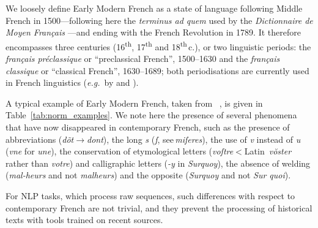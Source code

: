 We loosely define Early Modern French as a state of language following Middle French in 1500---following here the \emph{terminus ad quem} used by the \emph{Dictionnaire de Moyen Français} \cite{martin-2020-dictionnaire}---and ending with the French Revolution in 1789. It therefore encompasses three centuries (16\textsuperscript{th}, 17\textsuperscript{th} and 18\textsuperscript{th}\,c.), or two linguistic periods: the \emph{français préclassique} or ``preclassical French'', 1500--1630 and the \emph{français classique} or ``classical French'', 1630--1689; both periodisations are currently used in French linguistics (\emph{e.g.}~by  and ).

A typical example of Early Modern French, taken from ~, is given in Table~\ref{tab:norm_examples}. We note here the presence of several phenomena that have now disappeared in contemporary French, such as the presence of abbreviations (\emph{dõt}$\to$\emph{dont}), the long \emph{s} (\emph{ſ}, see\,\emph{miſeres}), the use of \emph{v} instead of \emph{u} (\emph{vne} for \emph{une}), the conservation of etymological letters (\emph{voſtre}$<$Latin~\emph{vŏster} rather than \emph{votre}) and calligraphic letters (\emph{-y} in \emph{Surquoy}), the absence of welding  (\emph{\mbox{mal-heurs}} and not \emph{malheurs}) and the opposite (\emph{Surquoy} and not \emph{Sur quoi}).

For NLP tasks, which process raw sequences, such differences with respect to contemporary French are not trivial, and they prevent the processing of historical texts with tools trained on recent sources.